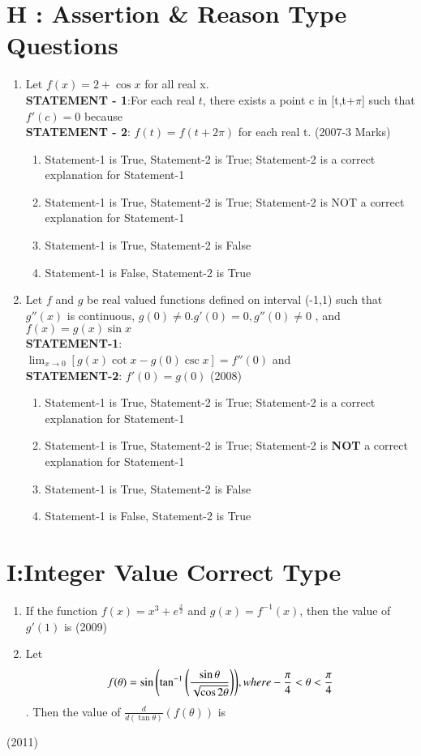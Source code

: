 \documentclass[journal,,12pt,twocolumn]{IEEEtran}
\theoremstyle{remark}
\begin{document}
\section*{H : Assertion \& Reason Type Questions}
\begin{enumerate}
    \item Let $f(x)=2 + \cos{x}$ for all real x.\\
    \textbf{STATEMENT - 1}:For each real $t$, there exists a point c in [t,t+$\pi$] such that $f'(c)=0$ because \\
    \textbf{STATEMENT - 2}: $f(t)=f(t+2\pi)$ for each real t.
    \hfill{(2007-3 Marks)}
    \begin{enumerate}[label=(\alph*)]
        \item Statement-1 is True, Statement-2 is True; Statement-2 is a correct explanation for Statement-1
        \item Statement-1 is True, Statement-2 is True; Statement-2 is NOT a correct explanation for Statement-1
        \item Statement-1 is True, Statement-2 is False 
        \item Statement-1 is False, Statement-2 is True
    \end{enumerate}
\item Let $f$ and $g$ be real valued functions defined on interval (-1,1) such that $g''(x)$ is continuous, $g(0)\neq0$.$g'(0)=0, g''(0)\neq0$ , and $f(x)=g(x)\sin{x}$\\
\textbf{STATEMENT-1}:\\
$\lim _{x \to 0}[g(x)\cot{x}-g(0)\csc{x}]=f''(0)$ and\\
\textbf{STATEMENT-2}: $f'(0)=g(0)$
\hfill{(2008)}
\begin{enumerate}[label=(\alph*)]
        \item Statement-1 is True, Statement-2 is True; Statement-2 is a correct explanation for Statement-1
        \item Statement-1 is True, Statement-2 is True; Statement-2 is \textbf{NOT} a correct explanation for Statement-1
        \item Statement-1 is True, Statement-2 is False 
        \item Statement-1 is False, Statement-2 is True
    \end{enumerate}
\end{enumerate}
\section*{I:Integer Value Correct Type}
\begin{enumerate}
    \item If the function $f(x)=x^3+e^{\frac{x}{2}}$ and $g(x)=f^{-1}(x)$, then the value of $g'(1)$ is 
    \hfill{(2009)}\\
    \item    Let \begin{align*}f(\theta)=\sin{\ensuremath{\left(\tan^{-1}{\left(\frac{\sin{\theta}}{\sqrt{\cos{2\theta}}}\right)}\right)}} , where -\frac{\pi}{4}<\theta<\frac{\pi}{4}\end{align*}. Then the value of $\frac{d}{d(\tan{\theta})}(f(\theta))$ is
\end{enumerate}  
\hfill{(2011)}
\end{document}
